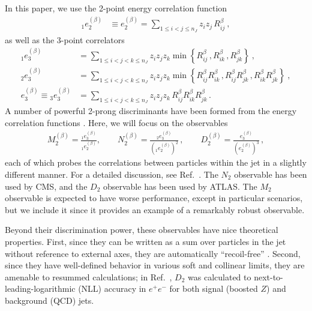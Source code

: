 \documentclass[11pt,letterpaper]{article}
\DeclareRobustCommand{\Ref}[1]{Ref.~\cite{#1}}
\newcommand{\ecf}[2]{e_{#1}^{(#2)}}
\newcommand{\ecfvar}[3]{{_{#1}e_{#2}^{(#3)}}}
\newcommand{\Dobs}[2]{D_{#1}^{(#2)}}
\newcommand{\Dobsnobeta}[1]{D_{#1}}
\begin{document}
In this paper, we use the 2-point energy correlation function
\begin{align}\label{eq:explicit_twopointvar}
\ecfvar{1}{2}{\beta}&\equiv\ecf{2}{\beta}=\sum_{1\leq i<j\leq n_J} z_{i}z_{j} \, R_{ij}^\beta\ ,
\end{align}
as well as the 3-point correlators
\begin{align}\label{eq:explicit_ecfvar}
\ecfvar{1}{3}{\beta}&=\sum_{1\leq i<j<k\leq n_J} z_{i}z_{j}z_{k} \min \left\{ R_{ij}^\beta\,,  R_{ik}^\beta\,, R_{jk}^\beta  \right\} \ , \nonumber \\
\ecfvar{2}{3}{\beta}&=\sum_{1\leq i<j<k\leq n_J} z_{i}z_{j}z_{k} \min \left\{R_{ij}^\beta R_{ik}^\beta\,, R_{ij}^\beta  R_{jk}^\beta\,,     R_{ik}^\beta R_{jk}^\beta    \right\}  \ , \nonumber \\
\ecf{3}{\beta}\equiv\ecfvar{3}{3}{\beta}&=\sum_{1\leq i<j<k\leq n_J} z_{i}z_{j}z_{k} \, R_{ij}^\beta R_{ik}^\beta R_{jk}^\beta \,.
\end{align}
%
A number of powerful 2-prong discriminants have been formed from the energy correlation functions  \cite{Larkoski:2013eya,Larkoski:2014gra,Larkoski:2014zma,Moult:2016cvt}.  Here, we will focus on the observables
\begin{align}
 M_2^{(\beta)} = \frac{\ecfvar{1}{3}{\beta}}{\ecfvar{1}{2}{\beta}}, \qquad  N_2^{(\beta)} = \frac{\ecfvar{2}{3}{\beta}}{(\ecfvar{1}{2}{\beta})^2}\,, \qquad  \Dobs{2}{\beta}=\frac{\ecf{3}{\beta}}{(\ecf{2}{\beta})^{3}}\,, 
\end{align}
each of which probes the correlations between particles within the jet in a slightly different manner.
%
For a detailed discussion, see \Ref{Moult:2016cvt}.
%
The $N_2$ observable has been used by CMS, and the $D_2$ observable has been used by ATLAS.
%
The $M_2$ observable is expected to have worse performance, except in particular scenarios, but we include it since it provides an example of a remarkably robust observable.

Beyond their discrimination power, these observables have nice theoretical properties.
%
First, since they can be written as a sum over particles in the jet without reference to external axes, they are automatically ``recoil-free'' \cite{Catani:1992jc,Dokshitzer:1998kz,Banfi:2004yd,Larkoski:2013eya,Larkoski:2014uqa}.
%
Second, since they have well-defined behavior in various soft and collinear limits, they are amenable to resummed calculations;  in \Ref{Larkoski:2015kga}, $\Dobsnobeta{2}$ was calculated to next-to-leading-logarithmic (NLL) accuracy in $e^+e^-$ for both signal (boosted $Z$) and background (QCD) jets. 
\end{document}
